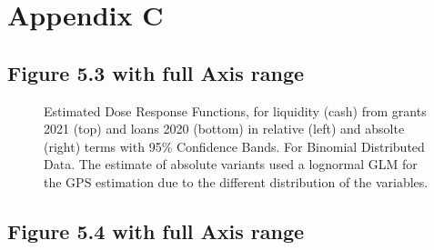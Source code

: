 
\chapter{Appendix C}





\section{Figure 5.3 with full Axis range}

\begin{figure}
    \centering
    
    \decoRule
    \caption[Response curves for grants and loans uncut]{Estimated Dose Response Functions, for liquidity (cash) from grants 2021 (top) and loans 2020 (bottom) in relative (left) and absolte (right) terms with 95\% Confidence Bands. For Binomial Distributed Data. The estimate of absolute variants used a lognormal GLM for the GPS estimation due to the different distribution of the variables.}
    \label{fig:Curve1raw}
\end{figure}


\section{Figure 5.4 with full Axis range}

